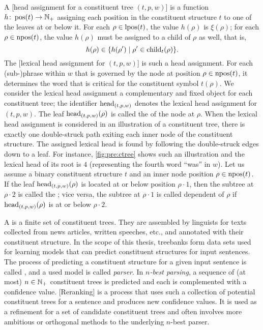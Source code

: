 \documentclass[../document.tex]{subfiles}
\begin{document}
    A [head assignment for a constituent tree $(t,p,w)$] is a function \(h\colon \operatorname{pos}(t) \to \mathbb{N}_+\) assigning each position in the constituent structure \(t\) to one of the leaves at or below it.
    For each \(\rho \in \operatorname{lpos}(t)\), the value \(h(\rho)\) is \(\xi(\rho)\); for each \(\rho \in \operatorname{npos}(t)\), the value \(h(\rho)\) must be assigned to a child of \(\rho\) as well, that is, \[
        h(\rho) \in \{ h(\rho') \mid \rho' \in \operatorname{child}_t(\rho) \} \text{.}
    \]
    The [lexical head assignment for $(t,p,w)$] is such a head assignment.
    For each (sub-)phrase within \(w\) that is governed by the node at position \(\rho \in \operatorname{npos}(t)\), it determines the word that is critical for the constituent symbol \(t(\rho)\).
    We consider the lexical head assignment a complementary and fixed object for each constituent tree; the identifier \(\operatorname{head}_{(t,p,w)}\) denotes the lexical head assignment for \((t,p,w)\).
    The leaf \(\operatorname{head}_{(t,p,w)}(\rho)\) is called the  of the node at \(\rho\).
    When the lexical head assignment is considered in an illustration of a constituent tree, there is exactly one double-struck path exiting each inner node of the constituent structure.
    The assigned lexical head is found by following the double-struck edges down to a leaf.
    For instance, \cref{fig:pre:ctree} shows such an illustration and the lexical head of its root is \(4\) (representing the fourth word ``was'' in $w$).
    Let us assume a binary constituent structure \(t\) and an inner node position \(\rho \in \operatorname{npos}(t)\).
    If the leaf \(\operatorname{head}_{(t,p,w)}(\rho)\) is located at or below position \(\rho \cdot 1\), then the subtree at \(\rho \cdot 2\) is called the ; vice versa, the subtree at \(\rho \cdot 1\) is called dependent of $\rho$ if \(\operatorname{head}_{(t,p,w)}(\rho)\) is at or below \(\rho \cdot 2\).

    A  is a finite set of constituent trees.
    They are assembled by linguists for texts collected from news articles, written speeches, etc., and annotated with their constituent structure.
    In the scope of this thesis, treebanks form data sets used for learning models that can predict constituent structures for input sentences.
    The process of predicting a constituent structure for a given input sentence is called , and a used model is called \emph{parser}.
    In \emph{\(n\)-best parsing}, a sequence of (at most) \(n \in \mathbb{N}_+\) constituent trees is predicted and each is complemented with a confidence value.
    [Reranking] is a process that uses such a collection of potential constituent trees for a sentence and produces new confidence values.
    It is used as a refinement for a set of candidate constituent trees and often involves more ambitious or orthogonal methods to the underlying \(n\)-best parser.
\end{document}

